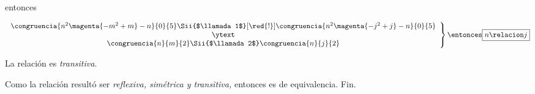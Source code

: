 \begin{enumerate}[label=\alph*)]
        entonces

        $$
          \left.
          \begin{array}{c}
            \congruencia{n^2 \magenta{- m^2 + m} - n}{0}{5}
            \Sii{$\llamada1$}[\red{!}]
            \congruencia{n^2 \magenta{- j^2 + j} - n}{0}{5}
            \\
            \ytext \\
            \congruencia{n}{m}{2}
            \Sii{$\llamada2$}
            \congruencia{n}{j}{2}
          \end{array}
          \right\}
          \entonces
          \boxed{
            n \relacion j}
        $$\par
        La relación es \textit{transitiva}.\par
        Como la relación resultó ser \textit{reflexiva, simétrica y transitiva,} entonces es de equivalencia. Fin.
\end{enumerate}

\begin{aportes}
  \item {}
\end{aportes}
